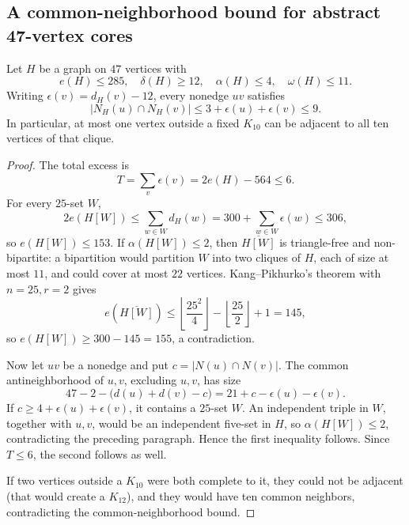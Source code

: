 \subsection{A common-neighborhood bound for abstract 47-vertex cores}

\begin{lemma}
\label{lem:common-neighbor}
Let $H$ be a graph on $47$ vertices with
\[
e(H)\leq285,\quad\delta(H)\geq12,\quad
\alpha(H)\leq4,\quad\omega(H)\leq11.
\]
Writing $\epsilon(v)=d_H(v)-12$, every nonedge $uv$ satisfies
\[
|N_H(u)\cap N_H(v)|\leq3+\epsilon(u)+\epsilon(v)\leq9.
\]
In particular, at most one vertex outside a fixed $K_{10}$ can be adjacent to all ten vertices of that clique.
\end{lemma}

\begin{proof}
The total excess is
\[
T=\sum_v\epsilon(v)=2e(H)-564\leq6.
\]
For every $25$-set $W$,
\[
2e(H[W])\leq\sum_{w\in W}d_H(w)
=300+\sum_{w\in W}\epsilon(w)\leq306,
\]
so $e(H[W])\leq153$. If $\alpha(H[W])\leq2$, then $\overline{H[W]}$ is triangle-free and non-bipartite: a bipartition would partition $W$ into two cliques of $H$, each of size at most $11$, and could cover at most $22$ vertices. Kang--Pikhurko's theorem \cite{KangPikhurko2005} with $n=25,r=2$ gives
\[
e(\overline{H[W]})\leq
\left\lfloor\frac{25^2}{4}\right\rfloor-
\left\lfloor\frac{25}{2}\right\rfloor+1=145,
\]
so $e(H[W])\geq300-145=155$, a contradiction.

Now let $uv$ be a nonedge and put $c=|N(u)\cap N(v)|$. The common antineighborhood of $u,v$, excluding $u,v$, has size
\[
47-2-\bigl(d(u)+d(v)-c\bigr)
=21+c-\epsilon(u)-\epsilon(v).
\]
If $c\geq4+\epsilon(u)+\epsilon(v)$, it contains a $25$-set $W$. An independent triple in $W$, together with $u,v$, would be an independent five-set in $H$, so $\alpha(H[W])\leq2$, contradicting the preceding paragraph. Hence the first inequality follows. Since $T\leq6$, the second follows as well.

If two vertices outside a $K_{10}$ were both complete to it, they could not be adjacent (that would create a $K_{12}$), and they would have ten common neighbors, contradicting the common-neighborhood bound.
\end{proof}

